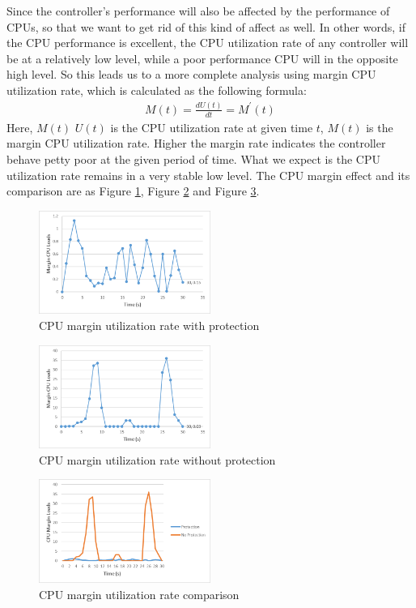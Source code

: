 \documentclass[conference]{IEEEtran}
\begin{document}
Since the controller's performance will also be affected by the performance of CPUs, so that we want to get rid of this kind of affect as well. In other words, if the CPU performance is excellent, the CPU utilization rate of any controller will be at a relatively low level, while a poor performance CPU will in the opposite high level. So this leads us to a more complete analysis using margin CPU utilization rate, which is calculated as the following formula:
\begin{align}
    M(t) = \frac{dU(t)}{dt}=M^{'}(t)
\end{align}
Here, $M(t)$ $U(t)$ is the CPU utilization rate at given time $t$, $M(t)$ is the margin CPU utilization rate. Higher the margin rate indicates the controller behave petty poor at the given period of time. What we expect is the CPU utilization rate remains in a very stable low level. The CPU margin effect and its comparison are as Figure \ref{fig:MCPUwProtect}, Figure \ref{fig:MCPUwoProtect} and Figure \ref{fig:MCPUComparison}.

\begin{figure}[h!]
\includegraphics[width=0.5\textwidth]{MCPUwProtect.png}
\caption{CPU margin utilization rate with protection }
\label{fig:MCPUwProtect}
\end{figure}

\begin{figure}[h!]
\includegraphics[width=0.5\textwidth]{MCPUwoProtect.png}
\caption{CPU margin utilization rate without protection}
\label{fig:MCPUwoProtect}
\end{figure}

\begin{figure}[h!]
\includegraphics[width=0.5\textwidth]{MCPUComparison.png}
\caption{CPU margin utilization rate comparison}
\label{fig:MCPUComparison}
\end{figure}
\end{document}
